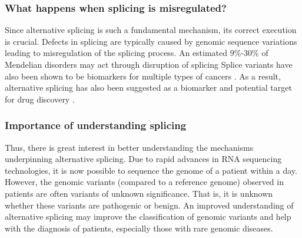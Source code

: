 \subsubsection{What happens when splicing is misregulated?}
Since alternative splicing is such a fundamental mechanism, its correct execution is crucial. Defects in splicing are typically caused by genomic sequence variations leading to misregulation of the splicing process. An estimated 9\%-30\% of Mendelian disorders may act through disruption of splicing \cite{comparison}
Splice variants have also been shown to be biomarkers for multiple types of cancers \cite{cancer} \cite{splicingcausescancer}. As a result, alternative splicing has also been suggested as a biomarker and potential target for drug discovery \cite{drugdiscoverysplicing}. \\

\subsubsection{Importance of understanding splicing}
Thus, there is great interest in better understanding the mechanisms underpinning alternative splicing. Due to rapid advances in RNA sequencing technologies, it is now possible to sequence the genome of a patient within a day. However, the genomic variants (compared to a reference genome) observed in patients are often variants of unknown significance. \cite{bretschneiderphdthesis} That is, it is unknown whether these variants are pathogenic or benign. An improved understanding of alternative splicing may improve the classification of genomic variants and help with the diagnosis of patients, especially those with rare genomic diseases.
